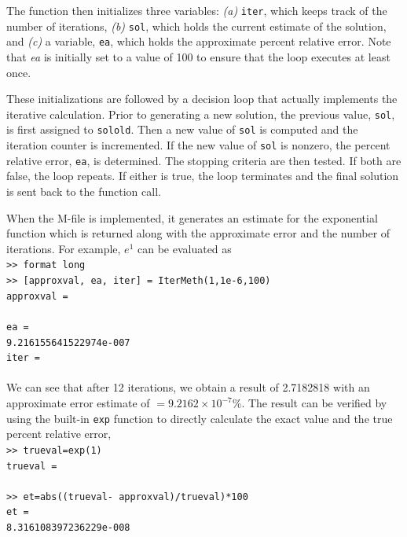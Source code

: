 \documentclass[../main.tex]{subfiles}
\begin{document}
The function then initializes three variables: \emph{(a)} \texttt{iter}, which keeps track of the number
of iterations, \emph{(b)} \texttt{sol}, which holds the current estimate of the solution, and \emph{(c)} a variable,
\texttt{ea}, which holds the approximate percent relative error. Note that \emph{ea} is initially set to a value
of 100 to ensure that the loop executes at least once.

These initializations are followed by a decision loop that actually implements the
iterative calculation. Prior to generating a new solution, the previous value, \texttt{sol}, is first assigned
to \texttt{solold}. Then a new value of \texttt{sol} is computed and the iteration counter is incremented.
If the new value of \texttt{sol} is nonzero, the percent relative error, \texttt{ea}, is determined.
The stopping criteria are then tested. If both are false, the loop repeats. If either is
true, the loop terminates and the final solution is sent back to the function call.

When the M-file is implemented, it generates an estimate for the exponential function
which is returned along with the approximate error and the number of iterations. For
example, $e^1$ can be evaluated as\\

\texttt{>> format long\\
\indent>> [approxval, ea, iter] = IterMeth(1,1e-6,100)\\
\indent approxval =\\ 
\indent{}\\
\indent ea =\\
\indent\indent 9.216155641522974e-007\\
\indent iter =\\
\indent{}}\\

We can see that after 12 iterations, we obtain a result of 2.7182818 with an
approximate error estimate of $= 9.2162 \times 10^{-7}\%$. The result can be verified by using
the built-in \texttt{exp} function to directly calculate the exact value and the true percent relative
error,\\

\texttt{>> trueval=exp(1)\\
\indent trueval =\\
\indent{}\\
\indent >> et=abs((trueval- approxval)/trueval)*100\\
\indent et =\\
\indent\indent 8.316108397236229e-008}\\
    
\end{document}

